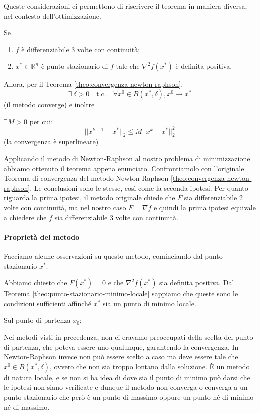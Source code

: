 Queste considerazioni ci permettono di riscrivere il teorema in
maniera diversa, nel contesto dell'ottimizzazione.

\begin{theo}
\label{theo:convergenza-newton-raphson-ottimizzazione} Se
\begin{enumerate}
\item $f$ \`e differenziabile 3 volte con continuit\`a;
\item $x^{*} \in \mathbb{R}^{n}$ \`e punto stazionario di $f$ tale che
$\nabla^{2} f(x^{*})$ \`e definita positiva.
\end{enumerate} Allora, per il Teorema
\ref{theo:convergenza-newton-raphson},
$$\exists~ \delta > 0 \quad \text{t.c.}\quad \forall x^{0} \in B(x^{*},\delta), x^{0} \rightarrow x^{*}$$
(il metodo converge) e inoltre

$\exists M > 0 $ per cui:
$$|| x^{k+1} -x^{*}||_{2} \leq M ||x^{k} - x^{*}||_{2}^{2}$$
(la convergenza è superlineare)
\end{theo}

Applicando il metodo di Newton-Raphson al nostro problema di
minimizzazione abbiamo ottenuto il teorema appena
enunciato. Confrontiamolo con l'originale Teorema di convergenza del
metodo Newton-Raphson \ref{theo:convergenza-newton-raphson}. Le
conclusioni sono le stesse, così come la seconda ipotesi. Per quanto
riguarda la prima ipotesi, il metodo originale chiede che $F$ sia
differenziabile 2 volte con continuit\`a, ma nel nostro caso $F=\nabla
f$ e quindi la prima ipotesi equivale a chiedere che $f$ sia
differenziabile 3 volte con continuit\`a.

\paragraph{Propriet\`a del metodo} Facciamo alcune osservazioni su
questo metodo, cominciando dal punto stazionario $x^*$.
\begin{observation} Abbiamo chiesto che $F(x^*)=0$ e che $\nabla^2 f
(x^*)$ sia definita positiva. Dal Teorema
\ref{theo:punto-stazionario-minimo-locale} sappiamo che queste sono le
condizioni sufficienti affinché $x^*$ sia un punto di minimo locale.
\end{observation}

Sul punto di partenza $x_0$:
\begin{observation} Nei metodi visti in precedenza, non ci eravamo
preoccupati della scelta del punto di partenza, che poteva essere uno
qualunque, garantendo la convergenza. In Newton-Raphson invece non può
essere scelto a caso ma deve essere tale che $x^{0} \in
B(x^{*},\delta)$, ovvero che non sia troppo lontano dalla soluzione. \`E
un metodo di natura locale, e se non si ha idea di dove sia il punto
di minimo può darsi che le ipotesi non siano verificate e dunque il
metodo non converga o converga a un punto stazionario che però \`e un
punto di massimo oppure un punto né di minimo né di massimo.
\end{observation}

